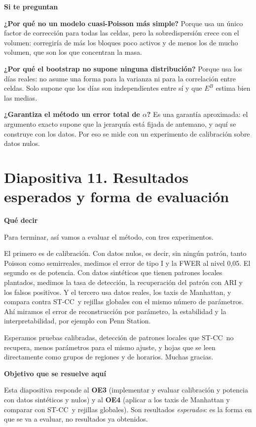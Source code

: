 \documentclass[11pt,a4paper]{article}
\newcommand{\cajainicio}[3]{\par\medskip\noindent
  \begin{lrbox}{\cajabox}\begin{minipage}{\dimexpr\linewidth-2\fboxsep-2\fboxrule\relax}%
  \textbf{\color{#1}#3}\par\smallskip}
\newcommand{\cajafin}[2]{\end{minipage}\end{lrbox}\fcolorbox{#1}{#2}{\usebox{\cajabox}}\par\medskip}
\newenvironment{guion}{\cajainicio{ucspblue}{ucspblue!6}{Qué decir}}{\cajafin{ucspblue}{ucspblue!6}}
\newenvironment{nota}[1]{\cajainicio{acc}{acc!7}{#1}}{\cajafin{acc}{acc!7}}
\newcommand{\STCC}{ST-CC}
\begin{document}
\begin{nota}{Si te preguntan}
\textbf{¿Por qué no un modelo cuasi-Poisson más simple?} Porque usa un único factor de corrección para todas las celdas, pero la sobredispersión crece con el volumen: corregiría de más los bloques poco activos y de menos los de mucho volumen, que son los que concentran la masa.

\textbf{¿Por qué el bootstrap no supone ninguna distribución?} Porque usa los días reales: no asume una forma para la varianza ni para la correlación entre celdas. Solo supone que los días son independientes entre sí y que $E^B$ estima bien las medias.

\textbf{¿Garantiza el método un error total de $\alpha$?} Es una garantía aproximada: el argumento exacto supone que la jerarquía está fijada de antemano, y aquí se construye con los datos. Por eso se mide con un experimento de calibración sobre datos nulos.
\end{nota}

\newpage
\section*{Diapositiva 11. Resultados esperados y forma de evaluación}

\begin{guion}
Para terminar, así vamos a evaluar el método, con tres experimentos.

El primero es de calibración. Con datos nulos, es decir, sin ningún patrón, tanto Poisson como semirreales, medimos el error de tipo I y la FWER al nivel 0,05. El segundo es de potencia. Con datos sintéticos que tienen patrones locales plantados, medimos la tasa de detección, la recuperación del patrón con ARI y los falsos positivos. Y el tercero usa datos reales, los taxis de Manhattan, y compara contra \STCC\ y rejillas globales con el mismo número de parámetros. Ahí miramos el error de reconstrucción por parámetro, la estabilidad y la interpretabilidad, por ejemplo con Penn Station.

Esperamos pruebas calibradas, detección de patrones locales que \STCC\ no recupera, menos parámetros para el mismo ajuste, y hojas que se leen directamente como grupos de regiones y de horarios. Muchas gracias.
\end{guion}

\begin{nota}{Objetivo que se resuelve aquí}
Esta diapositiva responde al \textbf{OE3} (implementar y evaluar calibración y potencia con datos sintéticos y nulos) y al \textbf{OE4} (aplicar a los taxis de Manhattan y comparar con \STCC\ y rejillas globales). Son resultados \emph{esperados}: es la forma en que se va a evaluar, no resultados ya obtenidos.
\end{nota}
\end{document}
